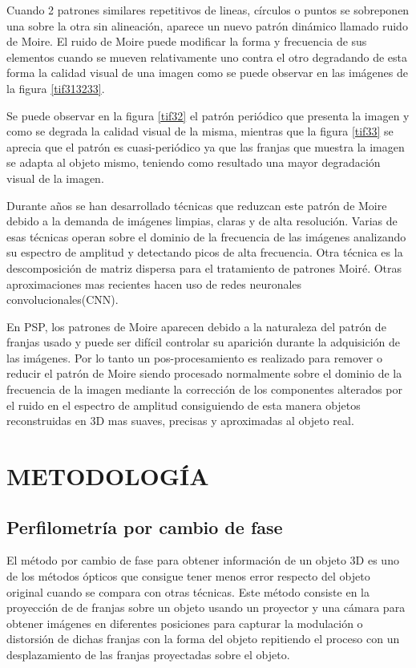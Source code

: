\documentclass[10pt,letterpaper]{article}
\begin{document}
Cuando 2 patrones similares repetitivos de lineas, círculos o puntos se sobreponen una sobre la otra sin alineación, aparece un nuevo patrón dinámico llamado ruido de Moire. El ruido de Moire puede modificar la forma y frecuencia de sus elementos cuando se mueven relativamente uno contra el otro degradando de esta forma la calidad visual de una imagen como se puede observar en las imágenes de la figura \ref{tif313233}\cite{Sun:Yu}. %

Se puede observar en la figura \ref{tif32} el patrón periódico que presenta la imagen y como se degrada la calidad visual de la misma, mientras que la figura \ref{tif33} se aprecia que el patrón es cuasi-periódico ya que las franjas que muestra la imagen se adapta al objeto mismo, teniendo como resultado una mayor degradación visual de la imagen.

Durante años se han desarrollado técnicas que reduzcan este patrón de Moire debido a la demanda de imágenes limpias, claras y de alta resolución. Varias de esas técnicas operan sobre el dominio de la frecuencia de las imágenes analizando su espectro de amplitud y detectando picos de alta frecuencia. Otra técnica es la descomposición de matriz dispersa para el tratamiento de patrones Moiré\cite{Alva:Orte}. Otras aproximaciones mas recientes hacen uso de redes neuronales convolucionales(CNN). %

En PSP, los patrones de Moire aparecen debido a la naturaleza del patrón de franjas usado y puede ser difícil controlar su aparición durante la adquisición de las imágenes. Por lo tanto un pos-procesamiento es realizado para remover o reducir el patrón de Moire siendo procesado normalmente sobre el dominio de la frecuencia de la imagen mediante la corrección de los componentes alterados por el ruido en el espectro de amplitud consiguiendo de esta manera objetos reconstruidas en 3D mas suaves, precisas y aproximadas al objeto real\cite{Wei:Wang}. 

\section{METODOLOGÍA}
\subsection{Perfilometría por cambio de fase}
El método por cambio de fase para obtener información de un objeto 3D es uno de los métodos ópticos que consigue tener menos error respecto del objeto original cuando se compara con otras técnicas. Este método consiste en la proyección de de franjas sobre un objeto usando un proyector y una cámara para obtener imágenes en diferentes posiciones para capturar la modulación o distorsión de dichas franjas con la forma del objeto repitiendo el proceso con un desplazamiento de las franjas proyectadas sobre el objeto.
\end{document}
